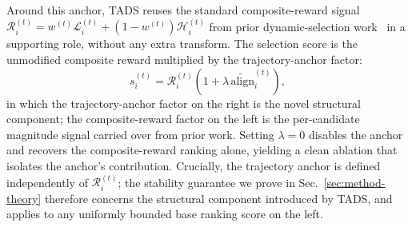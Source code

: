 Around this anchor, \textsc{TADS} reuses the standard
composite-reward signal $\mathcal{R}_i^{(t)} = w^{(t)}\mathcal{L}_i^{(t)} + (1-w^{(t)})\mathcal{H}_i^{(t)}$ from prior
dynamic-selection work~\cite{kung2023activeit, sun2025dots} in a
supporting role, without any extra transform. The selection score
is the unmodified composite reward multiplied by the
trajectory-anchor factor:
\[
s_i^{(t)}
=
\mathcal{R}_i^{(t)}
\left(
1+\lambda\,\widetilde{\mathrm{align}}_i^{(t)}
\right),
\]
in which the trajectory-anchor factor on the right is the novel
structural component; the composite-reward factor on the left
is the per-candidate magnitude signal carried over from prior
work. Setting $\lambda=0$ disables the anchor and recovers the
composite-reward ranking alone, yielding a clean ablation that
isolates the anchor's contribution. Crucially, the trajectory
anchor is defined independently of $\mathcal{R}_i^{(t)}$; the
stability guarantee we prove in Sec.~\ref{sec:method-theory}
therefore concerns the structural component introduced by
\textsc{TADS}, and applies to any uniformly bounded base ranking
score on the left.
